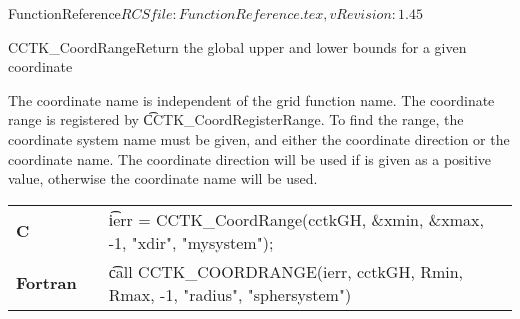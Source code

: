 \begin{cactuspart}{5}{FunctionReference}{$RCSfile: FunctionReference.tex,v $}{$Revision: 1.45 $}
\begin{CCTKFunc}{CCTK\_CoordRange}{Return the global upper and lower bounds for a given coordinate}
\label{CCTK-CoordRange}
\showargs
\begin{params}
\end{params}
\begin{discussion}
The coordinate name is independent of the grid function name.
The coordinate range is registered by {\t CCTK\_CoordRegisterRange}.
To find the range, the coordinate system name must be given, and either
the coordinate direction or the coordinate name. The coordinate direction
will be used if is given as a positive value, otherwise the coordinate
name will be used.
\end{discussion}
\begin{examples}
\begin{tabular}{@{}p{3cm}cp{11cm}}
\hfill {\bf C} && {\t ierr = CCTK\_CoordRange(cctkGH, \&xmin, \&xmax, -1, "xdir", "mysystem");}
\\
\hfill {\bf Fortran} && {\t call CCTK\_COORDRANGE(ierr, cctkGH, Rmin, Rmax, -1, "radius", "sphersystem")}
\\
\end{tabular}
\end{examples}
\begin{errorcodes}
\end{errorcodes}
\end{CCTKFunc}


\end{cactuspart}

